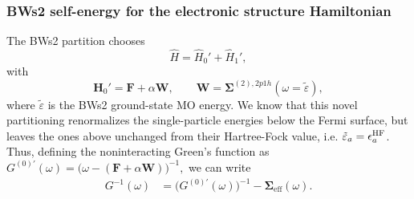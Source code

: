\subsubsection{BWs2 self-energy for the electronic structure Hamiltonian}
The BWs2 partition chooses
\begin{equation}
    \hat{H} = \hat{H}_0' + \hat{H}_1',
\end{equation}
with
\begin{equation}
\mathbf{H}_0' = \mathbf{F} + \alpha \mathbf{W},
\qquad
\mathbf{W} = \bm{\Sigma}^{(2),2p1h}(\omega = \tilde{\varepsilon}),
\end{equation}
where $\tilde{\varepsilon}$ is the BWs2 ground-state MO energy. We know that this novel partitioning renormalizes the single-particle energies below the Fermi surface, but leaves the ones above unchanged from their Hartree-Fock value, i.e. $\tilde{\varepsilon}_a = \epsilon_a^{\rm HF}$. Thus, defining the noninteracting Green's function as $
G^{(0)'}(\omega)
=
\big( \omega - (\mathbf{F} + \alpha \mathbf{W}) \big)^{-1},
$
we can write
\begin{align}
G^{-1}(\omega)
&= \big( G^{(0)'}(\omega) \big)^{-1}
   - \bm{\Sigma}_{\mathrm{eff}}(\omega).
\end{align}

